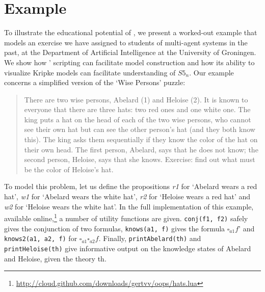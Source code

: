 \section{Example}
\label{sec:example}

To illustrate the educational potential of \oops\/, we present a worked-out example that models an exercise we have assigned to students of multi-agent systems in the past, at the Department of Artificial Intelligence at the University of Groningen.
We show how \oops' scripting can facilitate model construction and how its ability to visualize Kripke models can facilitate understanding of $S5_n$.
Our example concerns a simplified version of the `Wise Persons' puzzle:

\begin{quote}
There are two wise persons, Abelard (1) and Heloise (2). It is known to everyone that there are three hats: two red ones and one white one. The king puts a hat on the head of each of the two wise persons, who cannot see their own hat but can see the other person's hat (and they both know this). The king asks them sequentially if they know the color of the hat on their own head. The first person, Abelard, says that he does not know; the second person, Heloise, says that she knows.
Exercise: find out what must be the color of Heloise's hat.
\end{quote}

To model this problem,
let us define the propositions {\it r1} for `Abelard wears a red hat', {\it w1} for `Abelard wears the white hat', {\it r2} for `Heloise wears a red hat' and {\it w2} for `Heloise wears the white hat'.
In the full implementation of this example, available online,\footnote{\url{http://cloud.github.com/downloads/gertvv/oops/hats.lua}} a number of utility functions are given.
{\tt conj(f1, f2)} safely gives the conjunction of two formulas, {\tt knows(a1, f)} gives the formula $\square_{a1} f$' and {\tt knows2(a1, a2, f)} for $\square_{a1} \square_{a2} f$.
Finally, {\tt printAbelard(th)} and {\tt printHeloise(th)} give informative output on the knowledge states of Abelard and Heloise, given the theory th.

